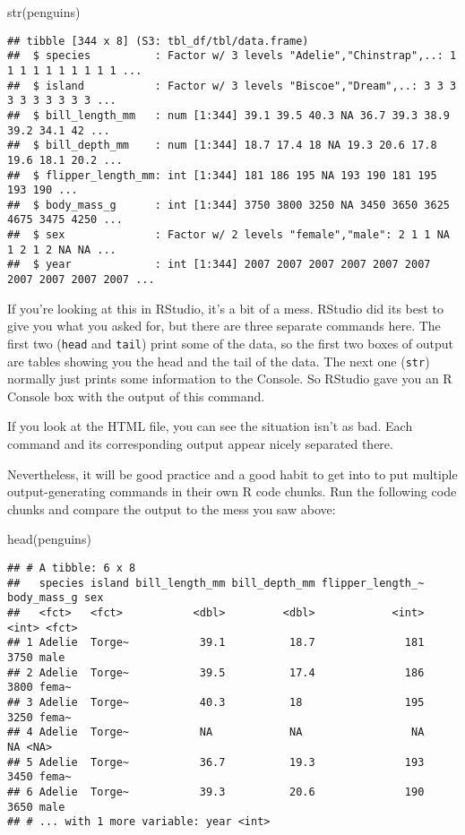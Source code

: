 \documentclass[
]{book}
\newenvironment{Shaded}{\begin{snugshade}}{\end{snugshade}}
\newcommand{\FunctionTok}[1]{\textcolor[rgb]{0.00,0.00,0.00}{#1}}
\newcommand{\NormalTok}[1]{#1}
\begin{document}
\begin{Shaded}
\begin{Highlighting}[]
\FunctionTok{str}\NormalTok{(penguins)}
\end{Highlighting}
\end{Shaded}

\begin{verbatim}
## tibble [344 x 8] (S3: tbl_df/tbl/data.frame)
##  $ species          : Factor w/ 3 levels "Adelie","Chinstrap",..: 1 1 1 1 1 1 1 1 1 1 ...
##  $ island           : Factor w/ 3 levels "Biscoe","Dream",..: 3 3 3 3 3 3 3 3 3 3 ...
##  $ bill_length_mm   : num [1:344] 39.1 39.5 40.3 NA 36.7 39.3 38.9 39.2 34.1 42 ...
##  $ bill_depth_mm    : num [1:344] 18.7 17.4 18 NA 19.3 20.6 17.8 19.6 18.1 20.2 ...
##  $ flipper_length_mm: int [1:344] 181 186 195 NA 193 190 181 195 193 190 ...
##  $ body_mass_g      : int [1:344] 3750 3800 3250 NA 3450 3650 3625 4675 3475 4250 ...
##  $ sex              : Factor w/ 2 levels "female","male": 2 1 1 NA 1 2 1 2 NA NA ...
##  $ year             : int [1:344] 2007 2007 2007 2007 2007 2007 2007 2007 2007 2007 ...
\end{verbatim}

If you're looking at this in RStudio, it's a bit of a mess. RStudio did its best to give you what you asked for, but there are three separate commands here. The first two (\texttt{head} and \texttt{tail}) print some of the data, so the first two boxes of output are tables showing you the head and the tail of the data. The next one (\texttt{str}) normally just prints some information to the Console. So RStudio gave you an R Console box with the output of this command.

If you look at the HTML file, you can see the situation isn't as bad. Each command and its corresponding output appear nicely separated there.

Nevertheless, it will be good practice and a good habit to get into to put multiple output-generating commands in their own R code chunks. Run the following code chunks and compare the output to the mess you saw above:

\begin{Shaded}
\begin{Highlighting}[]
\FunctionTok{head}\NormalTok{(penguins)}
\end{Highlighting}
\end{Shaded}

\begin{verbatim}
## # A tibble: 6 x 8
##   species island bill_length_mm bill_depth_mm flipper_length_~ body_mass_g sex  
##   <fct>   <fct>           <dbl>         <dbl>            <int>       <int> <fct>
## 1 Adelie  Torge~           39.1          18.7              181        3750 male 
## 2 Adelie  Torge~           39.5          17.4              186        3800 fema~
## 3 Adelie  Torge~           40.3          18                195        3250 fema~
## 4 Adelie  Torge~           NA            NA                 NA          NA <NA> 
## 5 Adelie  Torge~           36.7          19.3              193        3450 fema~
## 6 Adelie  Torge~           39.3          20.6              190        3650 male 
## # ... with 1 more variable: year <int>
\end{verbatim}
\end{document}
